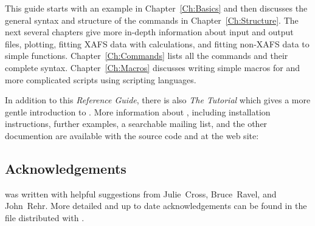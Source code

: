 This guide starts with an example in Chapter~\ref{Ch:Basics} and then
discusses the general syntax and structure of the commands in
Chapter~\ref{Ch:Structure}.  The next several chapters give more in-depth
information about input and output files, plotting, fitting XAFS data with
{\feff} calculations, and fitting non-XAFS data to simple functions.
Chapter~\ref{Ch:Commands} lists all the commands and their complete syntax.
Chapter~\ref{Ch:Macros} discusses writing simple macros for {\ifeffit} and
more complicated scripts using scripting languages.

In addition to this {\textsl{Reference Guide}}, there is also {\textsl{The
    {\ifeffit} Tutorial}} which gives a more gentle introduction to
{\ifeffit}.  More information about {\ifeffit}, including installation
instructions, further examples, a searchable mailing list, and the other
documention are available with the source code and at the {\ifeffit} web
site: {\WWWiff}

\subsection*{Acknowledgements} \label{ch:intro-ack}

{\ifeffit} was written with helpful suggestions from Julie~Cross,
Bruce~Ravel, and John~Rehr.  More detailed and up to date acknowledgements
can be found in the {} file distributed with {\ifeffit}.

